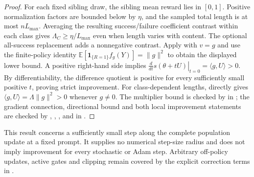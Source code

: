 \begin{proof}
For each fixed sibling draw, the sibling mean reward lies in $[0,1]$.
Positive normalization factors are bounded below by $\eta$, and the sampled
total length is at most $nL_{\max}$. Averaging the resulting success/failure
coefficient contrast within each class gives
$\Lambda_C\ge\eta/L_{\max}$ even when length varies with content.
The optional all-success replacement adds a nonnegative contrast.
Apply  with $v=g$ and use the
finite-policy identity
$\mathbb E[\mathbf 1_{\{R=1\}}f_g(Y)]=\|g\|^2$ to obtain the displayed
lower bound. A positive right-hand side implies
$\left.\frac{d}{dt}s(\theta+tU)\right|_{t=0}=\langle g,U\rangle>0$.
By differentiability, the difference quotient is positive for every
sufficiently small positive $t$, proving strict improvement.
For class-dependent lengths,  directly
gives $\langle g,U\rangle=\Lambda\|g\|^2>0$ whenever $g\ne0$.
The multiplier bound is checked by
 in
; the gradient connection, directional bound
and both local improvement statements are checked by
, ,
, 
and 
in .
\end{proof}

This result concerns a sufficiently small step along the complete population
update at a fixed prompt. It supplies no numerical step-size radius and does
not imply improvement for every stochastic or Adam step. Arbitrary
off-policy updates, active gates and clipping remain covered by the explicit
correction terms in .

